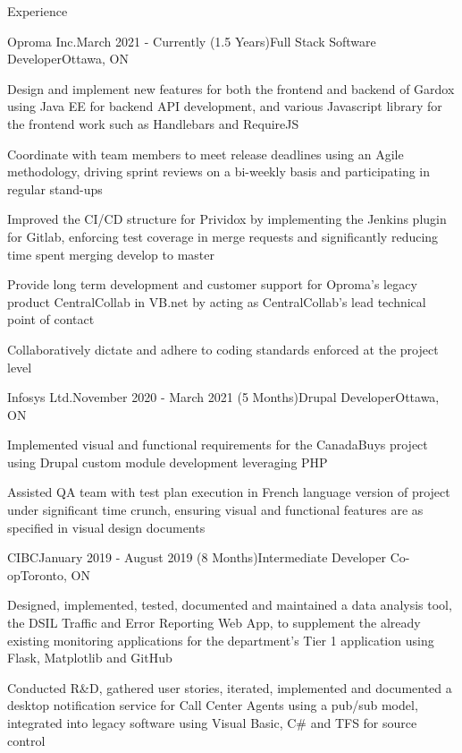 \documentclass{resume} %
\begin{document}


\begin{rSection}{Experience}
\begin{rSubsection}{Oproma Inc.}{March 2021 - Currently (1.5 Years)}{Full Stack Software Developer}{Ottawa, ON}
\item Design and implement new features for both the frontend and backend of Gardox using Java EE for backend API development, and various Javascript library for the frontend work such as Handlebars and RequireJS
\item Coordinate with team members to meet release deadlines using an Agile methodology, driving sprint reviews on a bi-weekly basis and participating in regular stand-ups
\item Improved the CI/CD structure for Prividox by implementing the Jenkins plugin for Gitlab, enforcing test coverage in merge requests and significantly reducing time spent merging develop to master
\item Provide long term development and customer support for Oproma's legacy product CentralCollab in VB.net by acting as CentralCollab's lead technical point of contact
\item Collaboratively dictate and adhere to coding standards enforced at the project level
\end{rSubsection}

\begin{rSubsection}{Infosys Ltd.}{November 2020 - March 2021 (5 Months)}{Drupal Developer}{Ottawa, ON}
\item Implemented visual and functional requirements for the CanadaBuys project using Drupal custom module development leveraging PHP
\item Assisted QA team with test plan execution in French language version of project under significant time crunch, ensuring visual and functional features are as specified in visual design documents
\end{rSubsection}

\begin{rSubsection}{CIBC}{January 2019 - August 2019 (8 Months)}{Intermediate Developer Co-op}{Toronto, ON}
\item Designed, implemented, tested, documented and maintained a data analysis tool, the DSIL Traffic and Error Reporting Web App, to supplement the already existing monitoring applications for the department’s Tier 1 application using Flask, Matplotlib and GitHub
\item Conducted R\&D, gathered user stories, iterated, implemented and documented a desktop notification service for Call Center Agents using a pub/sub model, integrated into legacy software using Visual Basic, C\# and TFS for source control
\end{rSubsection}


\end{rSection}
\end{document}
